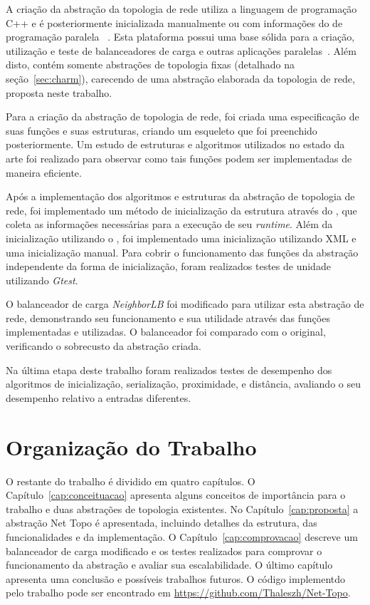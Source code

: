A criação da abstração da topologia de rede utiliza a linguagem de programação C++ e é posteriormente inicializada manualmente ou com informações do \fw de programação paralela \charm~\cite{website:CHARM}. 
Esta plataforma possui uma base sólida para a criação, utilização e teste de balanceadores de carga e outras aplicações paralelas~\cite{bhatele-thesis}. 
Além disto, \charm contém somente abstrações de topologia fixas (detalhado na seção~\ref{sec:charm}), carecendo de uma abstração elaborada da topologia de rede, proposta neste trabalho.

Para a criação da abstração de topologia de rede, foi criada uma especificação de suas funções e suas estruturas, criando um esqueleto que foi preenchido posteriormente. 
Um estudo de estruturas e algoritmos utilizados no estado da arte foi realizado para observar como tais funções podem ser implementadas de maneira eficiente.

Após a implementação dos algoritmos e estruturas da abstração de topologia de rede, foi implementado um método de inicialização da estrutura através do \fw \xspace \charm, que coleta as informações necessárias para a execução de seu \textit{runtime}.
Além da inicialização utilizando o \charm, foi implementado uma inicialização utilizando XML e uma inicialização manual.
Para cobrir o funcionamento das funções da abstração independente da forma de inicialização, foram realizados testes de unidade utilizando \textit{Gtest}.

O balanceador de carga \textit{NeighborLB} foi modificado para utilizar esta abstração de rede, demonstrando seu funcionamento e sua utilidade através das funções implementadas e utilizadas.
O balanceador foi comparado com o original, verificando o sobrecusto da abstração criada.

Na última etapa deste trabalho foram realizados testes de desempenho dos algoritmos de inicialização, serialização, proximidade, \hops e distância, avaliando o seu desempenho relativo a entradas diferentes.

\section{Organização do Trabalho}
\label{sec:organização}

O restante do trabalho é dividido em quatro capítulos.
O Capítulo~\ref{cap:conceituacao} apresenta alguns conceitos de importância para o trabalho e duas abstrações de topologia existentes.
No Capítulo~\ref{cap:proposta} a abstração Net Topo é apresentada, incluindo detalhes da estrutura, das funcionalidades e da implementação.
O Capítulo~\ref{cap:comprovacao} descreve um balanceador de carga modificado e os testes realizados para comprovar o funcionamento da abstração e avaliar sua escalabilidade.
O último capítulo apresenta uma conclusão e possíveis trabalhos futuros.
O código implementdo pelo trabalho pode ser encontrado em \href{https://github.com/Thaleszh/Net-Topo}{https://github.com/Thaleszh/Net-Topo}.
